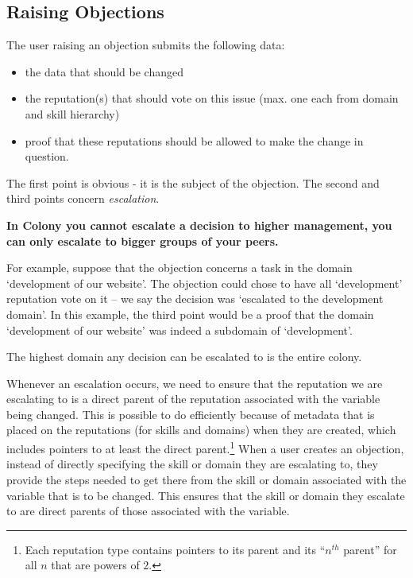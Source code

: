 \subsection{Raising Objections}\label{subsec:raising-objections}

The user raising an objection submits the following data:
\begin{itemize}
 \item the data that should be changed
 \item the reputation(s) that should vote on this issue (max. one each from domain and skill hierarchy)
 \item proof that these reputations should be allowed to make the change in question. 
\end{itemize}

The first point is obvious - it is the subject of the objection. The second and third points concern \emph{escalation}. 

\begin{center}
 \textbf{In Colony you cannot escalate a decision to higher management, you can only escalate to bigger groups of your peers.}
\end{center}

For example, suppose that the objection concerns a task in the domain `development of our website'. The objection could chose to have all `development' reputation vote on it -- we say the decision was `escalated to the development domain'. In this example, the third point would be a proof that the domain `development of our website' was indeed a subdomain of `development'.

The highest domain any decision can be escalated to is the entire colony.


Whenever an escalation occurs, we need to ensure that the reputation we are escalating to is a direct parent of the reputation associated with the variable being changed. This is possible to do efficiently because of metadata that is placed on the reputations (for skills and domains) when they are created, which includes pointers to at least the direct parent.\footnote{Each reputation type contains pointers to its parent  and its ``$n^{th}$ parent''  for all $n$ that are powers of $2$.} When a user creates an objection, instead of directly specifying the skill or domain they are escalating to, they provide the steps needed to get there from the skill or domain associated with the variable that is to be changed. This ensures that the skill or domain they escalate to are direct parents of those associated with the variable.

